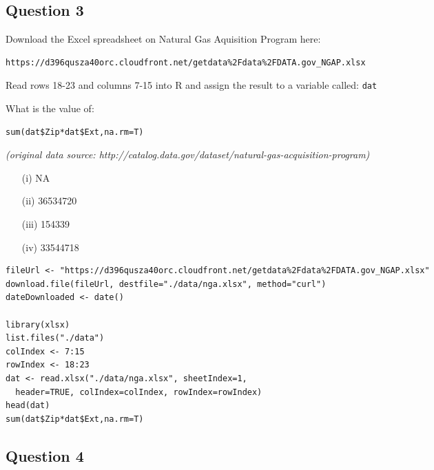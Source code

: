 \documentclass[]{article}
\begin{document}
\newpage
\subsection*{Question 3}

Download the Excel spreadsheet on Natural Gas Aquisition Program here: 

\begin{verbatim}
https://d396qusza40orc.cloudfront.net/getdata%2Fdata%2FDATA.gov_NGAP.xlsx 
\end{verbatim}

Read rows 18-23 and columns 7-15 into R and assign the result to a variable called:  \texttt{dat}  
\bigskip

What is the value of:  
\begin{framed}
\begin{verbatim}
sum(dat$Zip*dat$Ext,na.rm=T)  
\end{verbatim}
\end{framed}


\noindent \textit{(original data source: http://catalog.data.gov/dataset/natural-gas-acquisition-program)}

\begin{itemize} 
\item[(i)] NA 

\item[(ii)] 36534720 

\item[(iii)]  154339 

\item[(iv)] 33544718 
\end{itemize} 
\newpage
\begin{framed}
\begin{verbatim}
fileUrl <- "https://d396qusza40orc.cloudfront.net/getdata%2Fdata%2FDATA.gov_NGAP.xlsx"
download.file(fileUrl, destfile="./data/nga.xlsx", method="curl")
dateDownloaded <- date()

library(xlsx)
list.files("./data")
colIndex <- 7:15
rowIndex <- 18:23
dat <- read.xlsx("./data/nga.xlsx", sheetIndex=1, 
  header=TRUE, colIndex=colIndex, rowIndex=rowIndex)
head(dat)
sum(dat$Zip*dat$Ext,na.rm=T) 
\end{verbatim}
\end{framed}




\newpage
\subsection*{Question 4}
\end{document}

